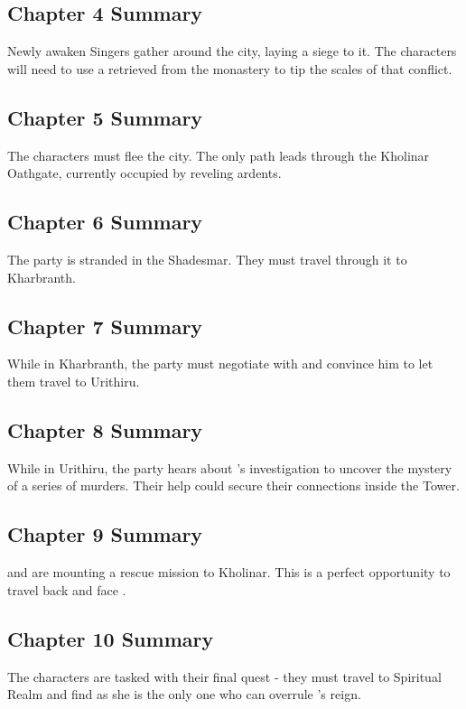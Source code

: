 \subsection{Chapter 4 Summary}

Newly awaken Singers gather around the city, laying a siege to it. The characters will need to use a \lootDustcaster{} retrieved from the monastery to tip the scales of that conflict.

\subsection{Chapter 5 Summary}

The characters must flee the city. The only path leads through the Kholinar Oathgate, currently occupied by reveling ardents.

\subsection{Chapter 6 Summary}

The party is stranded in the Shadesmar. They must travel through it to Kharbranth.

\subsection{Chapter 7 Summary}

While in Kharbranth, the party must negotiate with \npcTaravangian{} and convince him to let them travel to Urithiru.

\subsection{Chapter 8 Summary}

While in Urithiru, the party hears about \npcShallan{}'s investigation to uncover the mystery of a series of murders. Their help could secure their connections inside the Tower. 

\subsection{Chapter 9 Summary}

\npcDalinar{} and \npcElhokar{} are mounting a rescue mission to Kholinar. This is a perfect opportunity to travel back and face \npcQueen{}.

\subsection{Chapter 10 Summary}

The characters are tasked with their final quest - they must travel to Spiritual Realm and find \npcMishram{} as she is the only one who can overrule \npcOdium{}'s reign.



